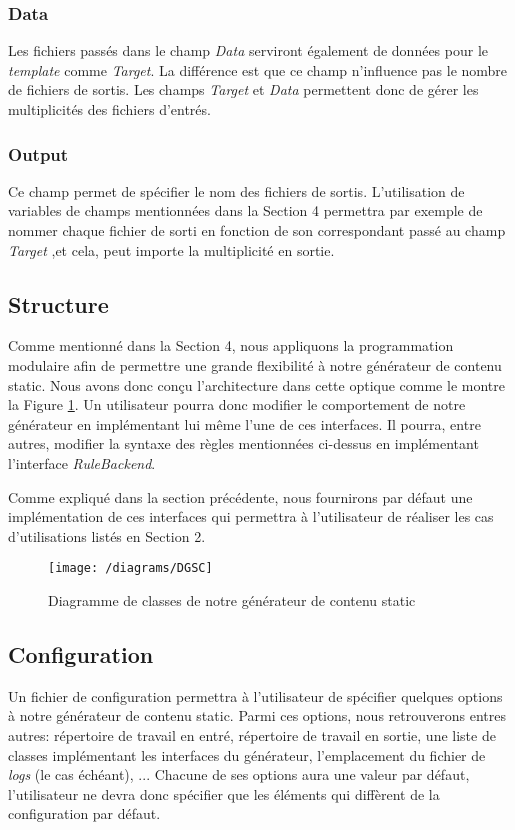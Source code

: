 		\subsubsection*{Data}
			Les fichiers passés dans le champ \textit{Data} serviront également de données pour le \textit{template} comme \textit{Target}. La différence est que ce champ n'influence pas le nombre de fichiers de sortis. Les champs \textit{Target} et \textit{Data} permettent donc de gérer les multiplicités des fichiers d'entrés.
		
		\subsubsection*{Output}
			Ce champ permet de spécifier le nom des fichiers de sortis. L'utilisation de variables de champs mentionnées dans la Section 4 permettra par exemple de nommer chaque fichier de sorti en fonction de son correspondant passé au champ \textit{Target} ,et cela, peut importe la multiplicité en sortie.
	
	
	\subsection{Structure}
		Comme mentionné dans la Section 4, nous appliquons la programmation modulaire afin de permettre une grande flexibilité à notre générateur de contenu static. Nous avons donc conçu l'architecture dans cette optique comme le montre la Figure \ref{fig:class_diagram}. Un utilisateur pourra donc modifier le comportement de notre générateur en implémentant lui même l'une de ces interfaces. Il pourra, entre autres, modifier la syntaxe des règles mentionnées ci-dessus en implémentant l'interface \textit{RuleBackend}.
		
		Comme expliqué dans la section précédente, nous fournirons par défaut une implémentation de ces interfaces qui permettra à l'utilisateur de réaliser les cas d'utilisations listés en Section 2.
		
		\begin{figure}
			\texttt{[image: /diagrams/DGSC]}
			\caption{Diagramme de classes de notre générateur de contenu static}
			\label{fig:class_diagram}
		\end{figure} 
	
	
	\subsection{Configuration}
		Un fichier de configuration permettra à l'utilisateur de spécifier quelques options à notre générateur de contenu static. Parmi ces options, nous retrouverons entres autres: répertoire de travail en entré, répertoire de travail en sortie, une liste de classes implémentant les interfaces du générateur, l'emplacement du fichier de \textit{logs} (le cas échéant), ... Chacune de ses options aura une valeur par défaut, l'utilisateur ne devra donc spécifier que les éléments qui diffèrent de la configuration par défaut. 